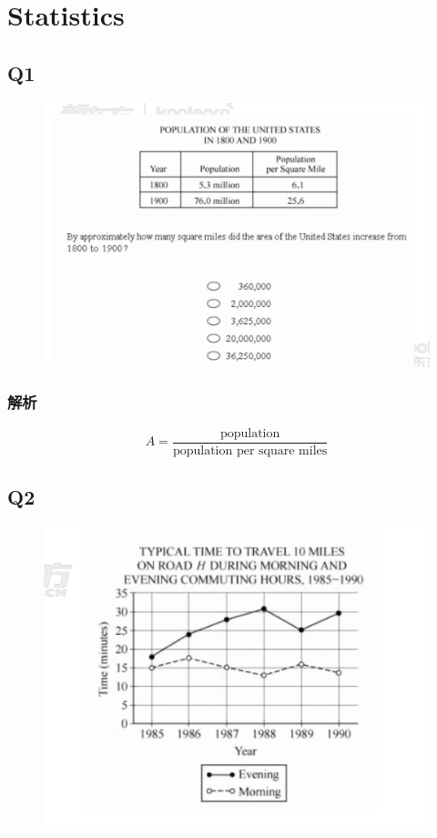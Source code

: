 \chapter{Statistics}

\section{Q1}

  \begin{figure}[H]
    \centering
    \includegraphics[width=0.7\columnwidth]{images/areas/stats/q1.png}
  \end{figure}

  \subsection{解析}

    \begin{equation*}
      A = \frac{\text{population}}{\text{population per square miles}}
    \end{equation*}

\section{Q2}

  \begin{figure}[H]
    \centering
    \includegraphics[width=0.7\columnwidth]{images/areas/stats/q2.png}
  \end{figure}

